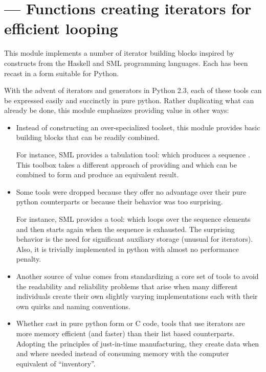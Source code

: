 \section{ ---
         Functions creating iterators for efficient looping}



This module implements a number of iterator building blocks inspired
by constructs from the Haskell and SML programming languages.  Each
has been recast in a form suitable for Python.

With the advent of iterators and generators in Python 2.3, each of
these tools can be expressed easily and succinctly in pure python.
Rather duplicating what can already be done, this module emphasizes
providing value in other ways:

\begin{itemize}

    \item Instead of constructing an over-specialized toolset, this module
        provides basic building blocks that can be readily combined.

        For instance, SML provides a tabulation tool: 
        which produces a sequence .  This toolbox
        takes a different approach of providing  and
         which can be combined to form
         and produce an equivalent result.

    \item Some tools were dropped because they offer no advantage over their
        pure python counterparts or because their behavior was too
        surprising.

        For instance, SML provides a tool:   which
        loops over the sequence elements and then starts again when the
        sequence is exhausted.  The surprising behavior is the need for
        significant auxiliary storage (unusual for iterators).  Also, it
        is trivially implemented in python with almost no performance
        penalty.

    \item Another source of value comes from standardizing a core set of tools
        to avoid the readability and reliability problems that arise when many
        different individuals create their own slightly varying implementations
        each with their own quirks and naming conventions.

    \item Whether cast in pure python form or C code, tools that use iterators
        are more memory efficient (and faster) than their list based counterparts.
        Adopting the principles of just-in-time manufacturing, they create
        data when and where needed instead of consuming memory with the
        computer equivalent of ``inventory''.

\end{itemize}

